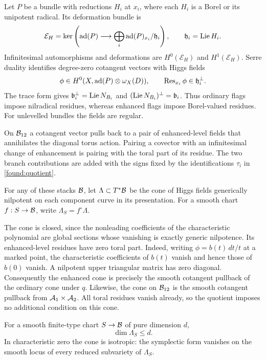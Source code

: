 Let $P$ be a bundle with reductions $H_i$ at $x_i$, where each $H_i$
is a Borel or its unipotent radical.  Its deformation bundle is
\[
 \mathcal E_H=\ker\left(\operatorname{ad}(P)\longrightarrow
              \bigoplus_i\operatorname{ad}(P)_{x_i}/\mathfrak h_i\right),
 \qquad \mathfrak h_i=\operatorname{Lie} H_i.
\]
Infinitesimal automorphisms and deformations are $H^0(\mathcal E_H)$
and $H^1(\mathcal E_H)$.  Serre duality identifies degree-zero
cotangent vectors with Higgs fields
\begin{equation}\label{geom:residues}
 \phi\in H^0(X,\operatorname{ad}(P)\otimes\omega_X(D)),\qquad
            \operatorname{Res}_{x_i}\phi\in\mathfrak h_i^\perp.
\end{equation}
The trace form gives
$\mathfrak b_i^\perp=\operatorname{Lie} N_{B_i}$ and
$(\operatorname{Lie} N_{B_i})^\perp=\mathfrak b_i$.  Thus ordinary flags impose
nilradical residues, whereas enhanced flags impose Borel-valued
residues.  For unlevelled bundles the fields are regular.

On $\mathcal B_{12}$ a cotangent vector pulls back to a pair of enhanced-level
fields that annihilates the diagonal torus action.  Pairing a covector
with an infinitesimal change of enhancement is pairing with the toral
part of its residue.  The two branch contributions are added with the
signs fixed by the identifications $\tau_i$ in
\eqref{found:quotient}.

\begin{definition}\label{geom:cone}
For any of these stacks $\mathcal B$, let $\Lambda\subset T^*\mathcal B$ be the cone
of Higgs fields generically nilpotent on each component curve in its
presentation.  For a smooth chart $f:S\to\mathcal B$, write
$\Lambda_S=f^\circ\Lambda$.
\end{definition}

The cone is closed, since the nonleading coefficients of the
characteristic polynomial are global sections whose vanishing is
exactly generic nilpotence.  Its enhanced-level residues have zero
toral part.  Indeed, writing $\phi=b(t)\,dt/t$ at a marked point,
the characteristic coefficients of $b(t)$ vanish and hence those of
$b(0)$ vanish.  A nilpotent upper triangular matrix has zero diagonal.
Consequently the enhanced cone is precisely the smooth cotangent
pullback of the ordinary cone under $q$.  Likewise, the cone on
$\mathcal B_{12}$ is the smooth cotangent pullback from
$\mathcal A_1\times\mathcal A_2$.  All toral residues vanish already, so the
quotient imposes no additional condition on this cone.

\begin{proposition}\label{geom:dimension}
For a smooth finite-type chart $S\to\mathcal B$ of pure dimension $d$,
\[
                            \dim\Lambda_S\le d.
\]
In characteristic zero the cone is isotropic: the symplectic form
vanishes on the smooth locus of every reduced subvariety of
$\Lambda_S$.
\end{proposition}


